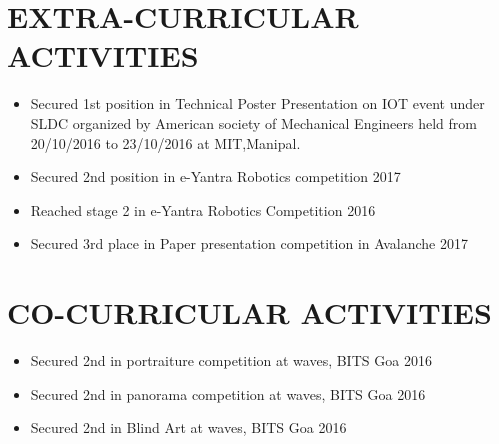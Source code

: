 \documentclass[paper=a4,fontsize=11pt]{scrartcl}
\newcommand{\NewPart}[1]{\section*{\uppercase{#1}}}
\begin{document}
\NewPart{Extra-Curricular Activities}
\begin{itemize}
\item Secured 1st position in Technical Poster Presentation on IOT event under
SLDC organized by American society of Mechanical Engineers held from
20/10/2016 to 23/10/2016 at MIT,Manipal.
\item Secured 2nd position in e-Yantra Robotics competition 2017
\item Reached stage 2 in e-Yantra Robotics Competition 2016
\item Secured 3rd place in Paper presentation competition in Avalanche 2017
\end{itemize}
\NewPart{Co-Curricular Activities}
\begin{itemize}

\item Secured 2nd in portraiture competition at waves, BITS Goa 2016
\item Secured 2nd in  panorama competition at waves, BITS Goa 2016
\item Secured 2nd  in Blind Art at waves, BITS Goa 2016
\end{itemize}
\end{document}
